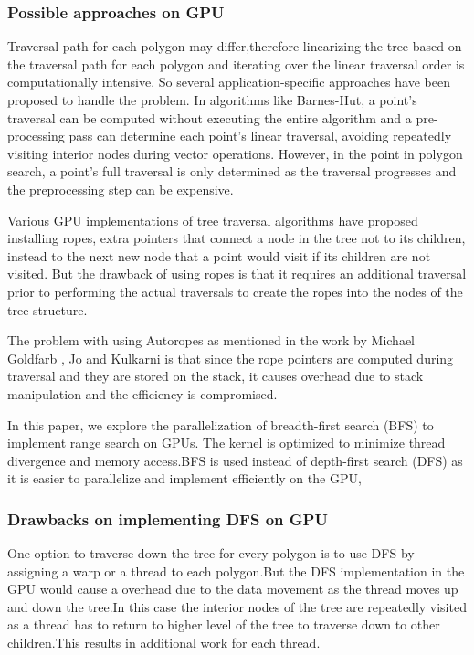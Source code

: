 \documentclass{article}
\begin{document}
\subsubsection{Possible approaches on GPU}

Traversal path for each polygon may differ,therefore linearizing the tree based on the traversal path for each polygon and iterating over the linear traversal order is computationally intensive.
So several application-specific approaches have been proposed to handle the problem. 
 In algorithms like Barnes-Hut,  a point's traversal can be computed without executing the entire algorithm and a pre- processing pass can determine each point's linear traversal, avoiding repeatedly visiting interior nodes during vector operations. However, in the point in polygon search, a point's full traversal is only determined as the traversal progresses and the preprocessing step can be expensive.
 
 Various GPU implementations of tree traversal algorithms have proposed installing ropes, extra pointers that connect a node in the tree not to its children,  instead to the next new node that a point would visit if its children are not visited. But the drawback of using ropes is that it requires an additional traversal prior to performing the actual traversals to create the ropes into the nodes of the tree structure.
 
The problem with using Autoropes as  mentioned in the work by Michael Goldfarb , Jo and Kulkarni is that since the rope pointers are computed during traversal and they are stored on the stack, it causes overhead due to stack manipulation and the efficiency is compromised.
 
In this paper, we explore the parallelization of breadth-first search (BFS)  to implement range search on GPUs. The kernel is optimized to minimize thread divergence and memory access.BFS is used instead of depth-first search (DFS) as it is easier to parallelize and implement efficiently on the GPU, 

\subsubsection{Drawbacks on implementing DFS on GPU}

One option to traverse down the tree for every polygon is to use DFS by assigning a warp or a thread to each polygon.But the DFS implementation in the GPU would cause a overhead due to the data movement as the thread moves up and down the tree.In this case the interior nodes of the tree are repeatedly visited as a thread has to return to higher level of the tree to traverse down to other children.This results in additional work for each thread.
\end{document}
